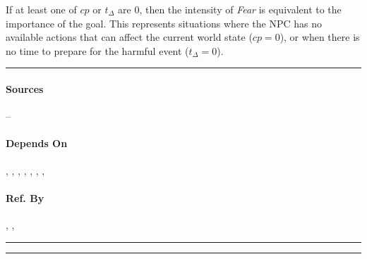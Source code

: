 If at least one of $cp$ or $t_{\Delta}$ are 0, then the intensity of
\textit{Fear} is equivalent to the importance of the goal. This represents
situations where the NPC has no available actions that can affect the current
world state ($cp = 0$), or when there is no time to prepare for the harmful
event ($t_{\Delta} = 0$). \\\hrule

\paragraph{Sources} --

\paragraph{Depends On} , , 
, , , 
, , 

\paragraph{Ref. By} , ,
 \\\hrule\vspace{0.5mm}\hrule

~\newline

